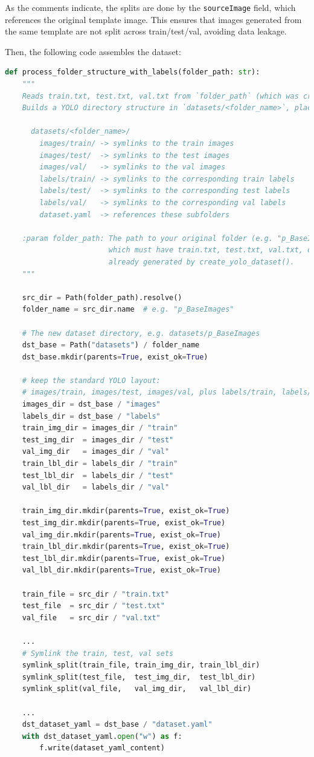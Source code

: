 As the comments indicate, the splits are done by the \texttt{sourceImage}
field, which references the original template image. This ensures that images
generated from the same template are not split across train/test/val, avoiding
data leakage.

Then, the following code assembles the dataset:

\begin{lstlisting}[language=Python, caption={Evaluation, assembling GARD dataset
in YOLO structure}]
def process_folder_structure_with_labels(folder_path: str):
    """
    Reads train.txt, test.txt, val.txt from `folder_path` (which was created by create_yolo_dataset).
    Builds a YOLO directory structure in `datasets/<folder_name>`, placing:
    
      datasets/<folder_name>/
        images/train/ -> symlinks to the train images
        images/test/  -> symlinks to the test images
        images/val/   -> symlinks to the val images
        labels/train/ -> symlinks to the corresponding train labels
        labels/test/  -> symlinks to the corresponding test labels
        labels/val/   -> symlinks to the corresponding val labels
        dataset.yaml  -> references these subfolders

    :param folder_path: The path to your original folder (e.g. "p_BaseImages"),
                        which must have train.txt, test.txt, val.txt, dataset.yaml
                        already generated by create_yolo_dataset().
    """

    src_dir = Path(folder_path).resolve()
    folder_name = src_dir.name  # e.g. "p_BaseImages"

    # The new dataset directory, e.g. datasets/p_BaseImages
    dst_base = Path("datasets") / folder_name
    dst_base.mkdir(parents=True, exist_ok=True)

    # keep the standard YOLO layout:
    # images/train, images/test, images/val, plus labels/train, labels/test, labels/val
    images_dir = dst_base / "images"
    labels_dir = dst_base / "labels"
    train_img_dir = images_dir / "train"
    test_img_dir  = images_dir / "test"
    val_img_dir   = images_dir / "val"
    train_lbl_dir = labels_dir / "train"
    test_lbl_dir  = labels_dir / "test"
    val_lbl_dir   = labels_dir / "val"

    train_img_dir.mkdir(parents=True, exist_ok=True)
    test_img_dir.mkdir(parents=True, exist_ok=True)
    val_img_dir.mkdir(parents=True, exist_ok=True)
    train_lbl_dir.mkdir(parents=True, exist_ok=True)
    test_lbl_dir.mkdir(parents=True, exist_ok=True)
    val_lbl_dir.mkdir(parents=True, exist_ok=True)

    train_file = src_dir / "train.txt"
    test_file  = src_dir / "test.txt"
    val_file   = src_dir / "val.txt"

    ...
    # Symlink the train, test, val sets
    symlink_split(train_file, train_img_dir, train_lbl_dir)
    symlink_split(test_file,  test_img_dir,  test_lbl_dir)
    symlink_split(val_file,   val_img_dir,   val_lbl_dir)

    ...
    dst_dataset_yaml = dst_base / "dataset.yaml"
    with dst_dataset_yaml.open("w") as f:
        f.write(dataset_yaml_content)
\end{lstlisting}

